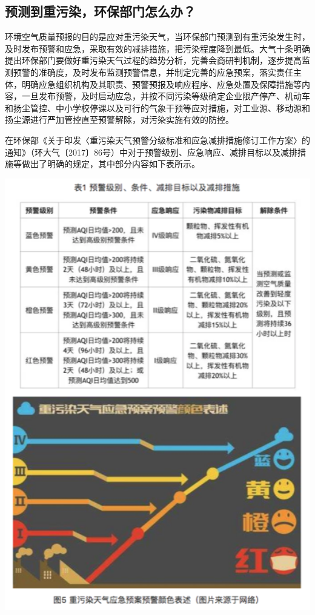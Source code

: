 \documentclass[]{book}
\begin{document}
\hypertarget{ux9884ux6d4bux5230ux91cdux6c61ux67d3ux73afux4fddux90e8ux95e8ux600eux4e48ux529e}{%
\subsection{预测到重污染，环保部门怎么办？}\label{ux9884ux6d4bux5230ux91cdux6c61ux67d3ux73afux4fddux90e8ux95e8ux600eux4e48ux529e}}

环境空气质量预报的目的是应对重污染天气，当环保部门预测到有重污染发生时，及时发布预警和应急，采取有效的减排措施，把污染程度降到最低。大气十条明确提出环保部门要做好重污染天气过程的趋势分析，完善会商研判机制，逐步提高监测预警的准确度，及时发布监测预警信息，并制定完善的应急预案，落实责任主体，明确应急组织机构及其职责、预警预报及响应程序、应急处置及保障措施等内容，一旦发布预警，及时启动应急，并按不同污染等级确定企业限产停产、机动车和扬尘管控、中小学校停课以及可行的气象干预等应对措施，对工业源、移动源和扬尘源进行严加管控直至预警解除，对污染实施有效的防控。

在环保部《关于印发〈重污染天气预警分级标准和应急减排措施修订工作方案〉的通知》（环大气〔2017〕86号）中对于预警级别、应急响应、减排目标以及减排措施等做出了明确的规定，其中部分内容如下表所示。

\includegraphics[width=5.89in]{images/kqyb5}
\end{document}
